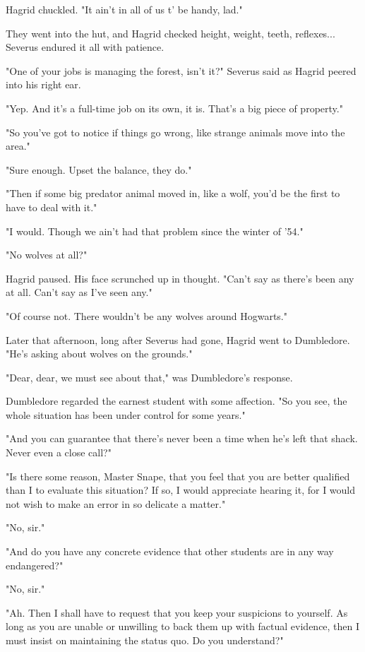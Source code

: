 Hagrid chuckled. "It ain't in all of us t' be handy, lad."

They went into the hut, and Hagrid checked height, weight, teeth, reflexes... Severus endured it all with patience.

"One of your jobs is managing the forest, isn't it?" Severus said as Hagrid peered into his right ear.

"Yep. And it's a full-time job on its own, it is. That's a big piece of property."

"So you've got to notice if things go wrong, like strange animals move into the area."

"Sure enough. Upset the balance, they do."

"Then if some big predator animal moved in, like a wolf, you'd be the first to have to deal with it."

"I would. Though we ain't had that problem since the winter of '54."

"No wolves at all?"

Hagrid paused. His face scrunched up in thought. "Can't say as there's been any at all. Can't say as I've seen any."

"Of course not. There wouldn't be any wolves around Hogwarts."

Later that afternoon, long after Severus had gone, Hagrid went to Dumbledore. "He's asking about wolves on the grounds."

"Dear, dear, we must see about that," was Dumbledore's response.

Dumbledore regarded the earnest student with some affection. "So you see, the whole situation has been under control for some years."

"And you can guarantee that there's never been a time when he's left that shack. Never even a close call?"

"Is there some reason, Master Snape, that you feel that you are better qualified than I to evaluate this situation? If so, I would appreciate hearing it, for I would not wish to make an error in so delicate a matter."

"No, sir."

"And do you have any concrete evidence that other students are in any way endangered?"

"No, sir."

"Ah. Then I shall have to request that you keep your suspicions to yourself. As long as you are unable or unwilling to back them up with factual evidence, then I must insist on maintaining the status quo. Do you understand?"

